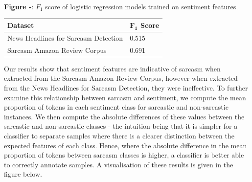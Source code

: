 \documentclass[12pt,a4paper]{article}
\begin{document}
\begin{center}
	\textbf{Figure -}: $F_1$ score of logistic regression models trained on sentiment features
\end{center}

\begin{center}
	\begin{tabular}{|p{7cm} | p{1.6cm}|} 
		\hline
		\textbf{Dataset} & \textbf{$\mathbf{F_1}$ Score} \\ [0.4ex] 
		\hline\hline
		News Headlines for Sarcasm Detection & 0.515 \\ 
		\hline
		Sarcasm Amazon Review Corpus & 0.691 \\ 
		\hline
	\end{tabular}
\end{center}

\noindent Our results show that sentiment features are indicative of sarcasm when extracted from the Sarcasm Amazon Review Corpus, however when extracted from the News Headlines for Sarcasm Detection, they were ineffective. To further examine this relationship between sarcasm and sentiment, we compute the mean proportion of tokens in each sentiment class for sarcastic and non-sarcastic instances. We then compute the absolute differences of these values between the sarcastic and non-sarcastic classes - the intuition being that it is simpler for a classifier to separate samples where there is a clearer distinction between the expected features of each class. Hence, where the absolute difference in the mean proportion of tokens between sarcasm classes is higher, a classifier is better able to correctly annotate samples. A visualisation of these results is given in the figure below.
\vfill
\end{document}
